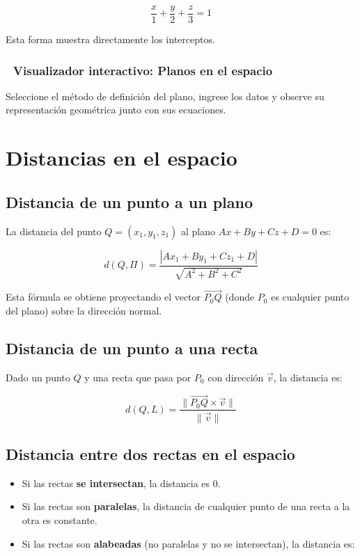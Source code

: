 \documentclass[
]{book}
\providecommand{\tightlist}{%
  \setlength{\itemsep}{0pt}\setlength{\parskip}{0pt}}
\begin{document}
\[
\frac{x}{1} + \frac{y}{2} + \frac{z}{3} = 1
\]

Esta forma muestra directamente los interceptos.

\subsubsection{🧮 Visualizador interactivo: Planos en el espacio}\label{visualizador-interactivo-planos-en-el-espacio}

Seleccione el método de definición del plano, ingrese los datos y observe su representación geométrica junto con sus ecuaciones.

\section{Distancias en el espacio}\label{distancias-en-el-espacio}

\subsection{Distancia de un punto a un plano}\label{distancia-de-un-punto-a-un-plano}

La distancia del punto \(Q = (x_1, y_1, z_1)\) al plano \(Ax + By + Cz + D = 0\) es:

\[
d(Q, \Pi) = \frac{|Ax_1 + By_1 + Cz_1 + D|}{\sqrt{A^2 + B^2 + C^2}}
\]

Esta fórmula se obtiene proyectando el vector \(\overrightarrow{P_0 Q}\) (donde \(P_0\) es cualquier punto del plano) sobre la dirección normal.

\subsection{Distancia de un punto a una recta}\label{distancia-de-un-punto-a-una-recta}

Dado un punto \(Q\) y una recta que pasa por \(P_0\) con dirección \(\vec{v}\), la distancia es:

\[
d(Q, L) = \frac{\|\overrightarrow{P_0 Q} \times \vec{v}\|}{\|\vec{v}\|}
\]

\subsection{Distancia entre dos rectas en el espacio}\label{distancia-entre-dos-rectas-en-el-espacio}

\begin{itemize}
\tightlist
\item
  Si las rectas \textbf{se intersectan}, la distancia es 0.
\item
  Si las rectas son \textbf{paralelas}, la distancia de cualquier punto de una recta a la otra es constante.
\item
  Si las rectas son \textbf{alabeadas} (no paralelas y no se intersectan), la distancia es:
\end{itemize}
\end{document}

